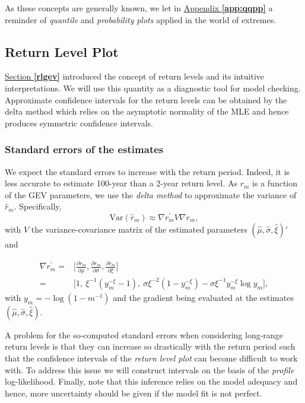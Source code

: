 As these concepts are generally known, we let in \hyperref[app:qqpp]{Appendix \textbf{\ref{app:qqpp}}} a reminder of \emph{quantile} and \emph{probability} \emph{plots} applied in the world of extremes.


\subsection{Return Level Plot}\label{rlplot}

\hyperref[rlgev]{Section \textbf{\ref{rlgev}}} introduced the concept of return levels and its intuitive interpretations. We will use this quantity as a diagnostic tool for model checking.  
Approximate confidence intervals for the return levels can be obtained by the
delta method which relies on the asymptotic normality of the MLE and hence produces symmetric confidence intervals.

\subsubsection*{Standard errors of the estimates}
 We expect the standard errors to increase with the return period. Indeed, it is less accurate to estimate 100-year than a 2-year return level.
As $r_m$ is a function of the GEV parameters, we use the \emph{delta method} to approximate the variance of $\hat{r}_m$. Specifically,
\begin{equation*}
\text{Var}(\hat{r}_m)\approx\nabla{r^{'}_m}V\nabla{r_m},
\end{equation*}
with $V$ the variance-covariance matrix of the estimated parameters $(\hat{\mu},\hat{\sigma},\hat{\xi})'$ and 

\begin{equation} \label{delta}
\begin{aligned}
\nabla r^{'}_m=
& \Bigg[\frac{\partial r_m}{\partial\mu},\frac{\partial r_m}{\partial\sigma},\frac{\partial r_m}{\partial\xi}\Bigg] \\ 
= & \Big[1,\ \xi^{-1}(y_m^{-\xi}-1),\ \sigma\xi^{-2}(1-y_m^{-\xi})-\sigma\xi^{-1}y_m^{-\xi}\log y_m\Big],
\end{aligned}
\end{equation}
with $y_m=-\log (1-m^{-1})$ and the gradient being evaluated at the estimates $(\hat{\mu},\hat{\sigma},\hat{\xi})$.

A problem for the so-computed standard errors when considering long-range return levels is that they can increase so drastically with the return period such that the confidence intervals of the \emph{return level plot} can become difficult to work with. To address this issue we will construct intervals on the basis of the \emph{profile} log-likelihood. Finally, note that this inference relies on the model adequacy and hence, more uncertainty should be given if the model fit is not perfect.


